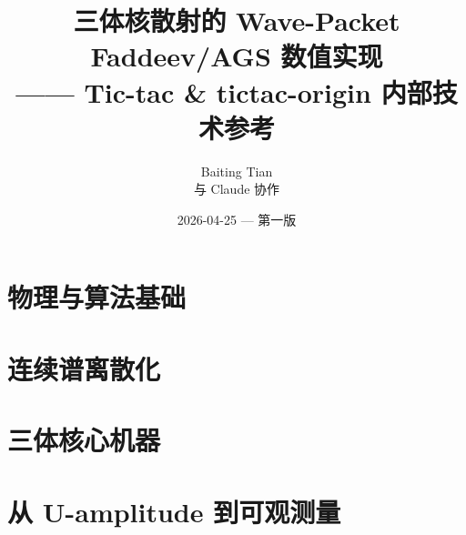 \documentclass[11pt, a4paper, oneside, openany]{book}
\title{
  \Huge 三体核散射的 Wave-Packet Faddeev/AGS 数值实现 \\[0.5em]
  \Large —— Tic-tac \& tictac-origin 内部技术参考
}
\author{Baiting Tian \\ \small 与 Claude 协作}
\date{2026-04-25 — 第一版}
\begin{document}
\frontmatter
\maketitle

\tableofcontents
\listoffigures
\listoftables



\mainmatter

\part{物理与算法基础}





\part{连续谱离散化}





\part{三体核心机器}




\part{从 U-amplitude 到可观测量}



\end{document}
